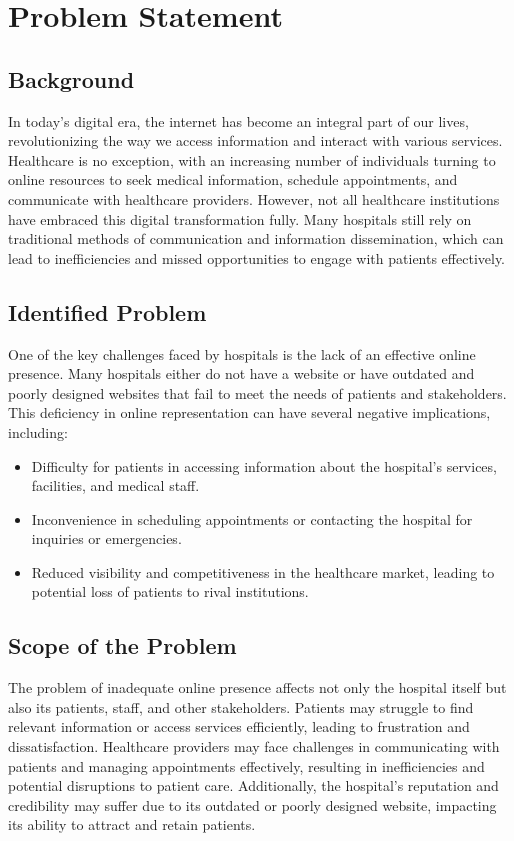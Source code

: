 \documentclass{article}
\begin{document}

\clearpage

\section{Problem Statement} \label{sec:problem_statement}
\subsection{Background}
In today's digital era, the internet has become an integral part of our lives, revolutionizing the way we access information and interact with various services. Healthcare is no exception, with an increasing number of individuals turning to online resources to seek medical information, schedule appointments, and communicate with healthcare providers. However, not all healthcare institutions have embraced this digital transformation fully. Many hospitals still rely on traditional methods of communication and information dissemination, which can lead to inefficiencies and missed opportunities to engage with patients effectively.

\subsection{Identified Problem}
One of the key challenges faced by hospitals is the lack of an effective online presence. Many hospitals either do not have a website or have outdated and poorly designed websites that fail to meet the needs of patients and stakeholders. This deficiency in online representation can have several negative implications, including:
\begin{itemize}
    \item Difficulty for patients in accessing information about the hospital's services, facilities, and medical staff.
    \item Inconvenience in scheduling appointments or contacting the hospital for inquiries or emergencies.
    \item Reduced visibility and competitiveness in the healthcare market, leading to potential loss of patients to rival institutions.
\end{itemize}

\subsection{Scope of the Problem}
The problem of inadequate online presence affects not only the hospital itself but also its patients, staff, and other stakeholders. Patients may struggle to find relevant information or access services efficiently, leading to frustration and dissatisfaction. Healthcare providers may face challenges in communicating with patients and managing appointments effectively, resulting in inefficiencies and potential disruptions to patient care. Additionally, the hospital's reputation and credibility may suffer due to its outdated or poorly designed website, impacting its ability to attract and retain patients.
\end{document}
